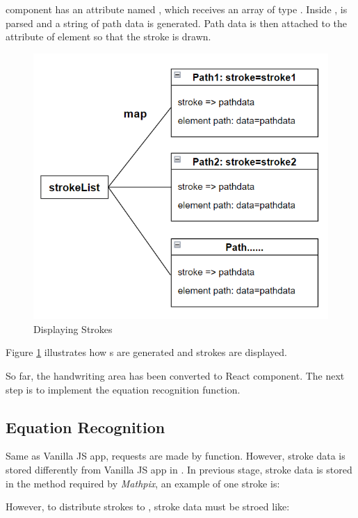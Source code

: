 \documentclass[12pt,twoside]{report}
\begin{document}
 component has an attribute named , which receives an
array of type . Inside ,  is parsed and a
string of path data is generated. Path data is then attached to the attribute of
element  so that the stroke is drawn.
\begin{figure}
    \centering
    \includegraphics[width=0.8\linewidth]{figures/path-structure.png}
    \caption{Displaying Strokes}
    \label{fig:path-structure}
\end{figure}

Figure \ref{fig:path-structure} illustrates how s are generated and
strokes are displayed.

So far, the handwriting area has been converted to React component. The next step is to implement the equation recognition function.

\subsection*{Equation Recognition}
Same as Vanilla JS app, requests are made by  function. However,
stroke data is stored differently from Vanilla JS app in . In
previous stage, stroke data is stored in the method required by
\textit{Mathpix}, an example of one stroke  is:

\centerline{}

However, to distribute strokes to , stroke data must be stroed like:

\centerline{}
\end{document}
